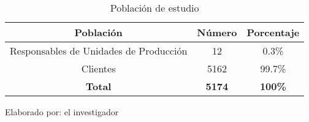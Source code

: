 \begin{table}[h!]
	\begin{center}
		\begin{threeparttable}
			\caption{Población de estudio}
			\label{table:poblacionestudio}
			\begin{tabular}{  c  c  c  }
				\midrule
				\textbf{Población}                     & \textbf{Número} & \textbf{Porcentaje} \\
				\midrule
				Responsables de Unidades de Producción & 12                & 0.3\%               \\
				Clientes                                 & 5162             & 99.7\%              \\
				\midrule
				\textbf{Total}                           & \textbf{5174}    & \textbf{100\%}      \\
				\midrule
			\end{tabular}
			\begin{tablenotes}[flushleft]
				\centering
				\item Elaborado por: el investigador
			\end{tablenotes}
		\end{threeparttable}
	\end{center}
\end{table}
